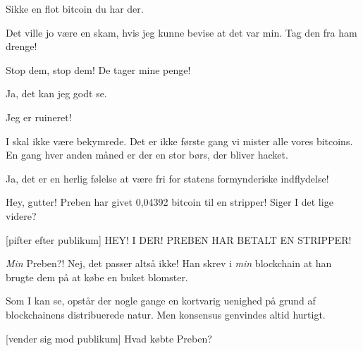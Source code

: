 \documentclass[a4paper,11pt]{article}
\begin{document}
\begin{sketch}

 Sikke en flot bitcoin du har der.


 Det ville jo være en skam, hvis jeg kunne bevise at det var min. Tag
den fra ham drenge!


 Stop dem, stop dem! De tager mine penge!


 Ja, det kan jeg godt se.

 Jeg er ruineret!


 I skal ikke være bekymrede. Det er ikke første gang vi mister alle
vores bitcoins. En gang hver anden måned er der en stor børs, der bliver
hacket.

 Ja, det er en herlig følelse at være fri for statens formynderiske
indflydelse!


 Hey, gutter! Preben har givet 0,04392 bitcoin til en stripper! Siger I
det lige videre?

[pifter efter publikum] HEY! I DER! PREBEN HAR BETALT EN
STRIPPER!


 \textit{Min} Preben?! Nej, det passer altså ikke! Han skrev i
\textit{min} blockchain at han brugte dem på at købe en buket
blomster.

 Som I kan se, opstår der nogle gange en kortvarig uenighed på grund af
blockchainens distribuerede natur. Men konsensus genvindes altid hurtigt.


[vender sig mod publikum] Hvad købte Preben?



\end{sketch}
\end{document}
